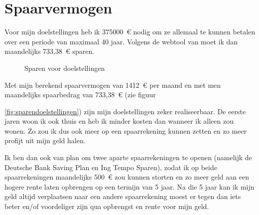 \newpage
\section{Spaarvermogen}



Voor mijn doelstellingen heb ik 375000~\euro{} nodig om ze allemaal te kunnen betalen over een periode van maximaal 40 jaar.
Volgens de webtool van  moet ik dan maandelijks 733,38~\euro{} sparen.

\begin{figure}[!htbp]
	\centering
	\caption{Sparen voor doelstellingen}
	\label{fig:sparendoelstellinen}
\end{figure}

Met mijn berekend spaarvermogen van 1412~\euro{} per maand en met men maandelijks spaarbedrag van 733,38~\euro{} (zie figuur


\ref{fig:sparendoelstellingen}) zijn mijn doelstellingen zeker realiseerbaar. De eerste jaren woon ik ook thuis en heb ik minder kosten dan wanneer ik alleen zou wonen. Zo zou ik dus ook meer op een spaarrekening kunnen zetten en zo meer profijt uit mijn geld halen.

Ik ben dan ook van plan om twee aparte spaarrekeningen te openen (namelijk de Deutsche Bank Saving Plan en Ing Tempo Sparen), zodat ik op beide spaarrekeningen maandelijks 500~\euro{} zou kunnen storten en zo meer geld aan een hogere rente laten opbrengen op een termijn van 5 jaar. Na die 5 jaar kan ik mijn geld altijd verplaatsen naar een andere spaarrekening moest er tegen dan iets beter en/of voordeliger zijn qua opbrengst en rente voor mijn geld.

